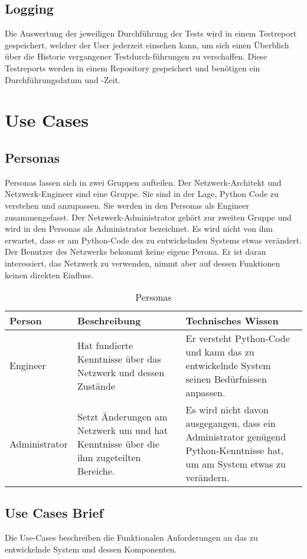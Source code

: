 \documentclass[
	ngerman,
	toc=listof, %
	toc=bibliography, %
	footnotes=multiple, %
	parskip=half, %
	numbers=noendperiod %
]{scrartcl}
\begin{document}
	\subsection{Logging}
		Die Auswertung der jeweiligen Durchführung der Tests wird in einem Testreport gespeichert, welcher der User jederzeit einsehen kann, 
		um sich einen Überblich über die Historie vergangener Testdurch-führungen zu verschaffen. 
		Diese Testreports werden in einem Repository gespeichert und benötigen ein Durchführungsdatum und -Zeit.

\section{Use Cases}
	\subsection{Personas}
	Personas lassen sich in zwei Gruppen aufteilen. Der Netzwerk-Architekt und Netzwerk-Engineer sind eine Gruppe. 
	Sie sind in der Lage, Python Code zu verstehen und anzupassen. Sie werden in den Personas als Engineer zusammengefasst.
	Der Netzwerk-Administrator gehört zur zweiten Gruppe und wird in den Personas als Administrator bezeichnet.
	Es wird nicht von ihm erwartet, dass er am Python-Code des zu entwickelnden Systems etwas verändert.
	Der Benutzer des Netzwerks bekommt keine eigene Perona. 
	Er ist daran interessiert, das Netzwerk zu verwenden, nimmt aber auf dessen Funktionen keinen direkten Einfluss.
	
	\begin{table}[!h]
		\begin{tabularx}{\textwidth}{lXX}
			\toprule
			Person & Beschreibung & Technisches Wissen \\
			\midrule
			Engineer & Hat fundierte Kenntnisse über das Netzwerk und dessen Zustände & Er versteht Python-Code und kann das zu entwickelnde System seinen Bedürfnissen anpassen.\\
			\midrule
			Administrator & Setzt Änderungen am Netzwerk um und hat Kenntnisse über die ihm zugeteilten Bereiche. & Es wird nicht davon ausgegangen, dass ein Administrator genügend Python-Kenntnisse hat, um am System etwas zu verändern.\\
			\bottomrule
		\end{tabularx}
		\caption{Personas}
	\end{table}
		
	\newpage

	\subsection{Use Cases Brief}
	Die Use-Cases beschreiben die Funktionalen Anforderungen an das zu entwickelnde System und dessen Komponenten.
\end{document}
